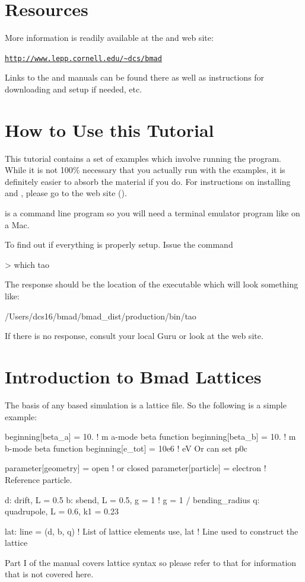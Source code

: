 \documentclass{hitec}
\newcommand{\Section}[1]{\section{#1}\vspace*{-1ex}}
\newenvironment{display}
  {\vspace*{-1.5ex} \begin{alltt}}
  {\end{alltt} \vspace*{-1.0ex}}
\begin{document}
\Section{Resources}
\label{s:resources}

More information is readily available at the \bmad and \tao web site:
\begin{display}
  \url{http://www.lepp.cornell.edu/~dcs/bmad}
\end{display}
Links to the \bmad and \tao manuals can be found there as well as instructions for
downloading and setup if needed, etc.

\Section{How to Use this Tutorial}

This tutorial contains a set of examples which involve running the \tao program. 
While it is not 100\% necessary that you actually run \tao with the examples, it is
definitely easier to absorb the material if you do. For instructions on installing \bmad
and \tao, please go to the \bmad web site ().

\tao is a command line program so you will need a terminal emulator program like  on a
Mac.

To find out if everything is properly setup. Issue the command
\begin{code}
> which tao
\end{code}
The response should be the location of the \tao executable which will look something like:
\begin{code}
/Users/dcs16/bmad/bmad_dist/production/bin/tao
\end{code}
If there is no response, consult your local \bmad Guru or look at the \bmad web site.

\Section{Introduction to Bmad Lattices}
\label{s:bmad.intro}

The basis of any \bmad based simulation is a lattice file. So the following is a
simple example:
\begin{code}
beginning[beta_a] = 10.   ! m  a-mode beta function
beginning[beta_b] = 10.   ! m  b-mode beta function
beginning[e_tot] = 10e6   ! eV   Or can set p0c

parameter[geometry] = open      ! or closed
parameter[particle] = electron  ! Reference particle.

d: drift, L = 0.5
b: sbend, L = 0.5, g = 1    ! g = 1 / bending_radius
q: quadrupole, L = 0.6, k1 = 0.23

lat: line = (d, b, q)   ! List of lattice elements
use, lat                ! Line used to construct the lattice
\end{code}
Part I of the \bmad manual covers lattice syntax so please refer to that for information that
is not covered here.
\end{document}
